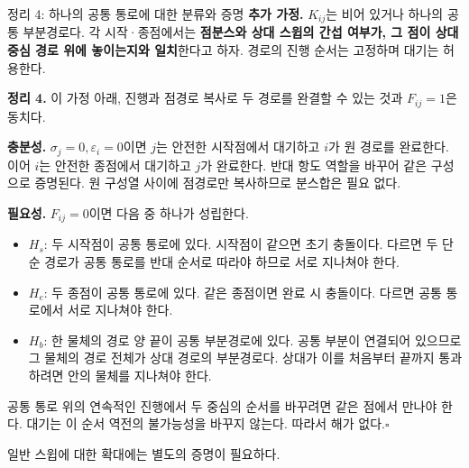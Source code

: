 \begin{frame}{정리 4: 하나의 공통 통로에 대한 분류와 증명}
\small
\textbf{추가 가정.} $K_{ij}$는 비어 있거나 하나의 공통 부분경로다.
각 시작·종점에서는 \textbf{점분스와 상대 스윕의 간섭 여부가,
그 점이 상대 중심 경로 위에 놓이는지와 일치}한다고 하자.
경로의 진행 순서는 고정하며 대기는 허용한다.
\par\smallskip
\textbf{정리 4.} 이 가정 아래,
진행과 점경로 복사로 두 경로를 완결할 수 있는 것과 $F_{ij}=1$은 동치다.
\par\smallskip
\textbf{충분성.} $\sigma_j=0,\varepsilon_i=0$이면 $j$는 안전한 시작점에서 대기하고
$i$가 원 경로를 완료한다. 이어 $i$는 안전한 종점에서 대기하고 $j$가 완료한다.
반대 항도 역할을 바꾸어 같은 구성으로 증명된다.
원 구성열 사이에 점경로만 복사하므로 분스합은 필요 없다.
\par\smallskip
\textbf{필요성.} $F_{ij}=0$이면 다음 중 하나가 성립한다.
\begin{itemize}
\item $H_s$: 두 시작점이 공통 통로에 있다. 시작점이 같으면 초기 충돌이다.
다르면 두 단순 경로가 공통 통로를 반대 순서로 따라야 하므로 서로 지나쳐야 한다.
\item $H_e$: 두 종점이 공통 통로에 있다. 같은 종점이면 완료 시 충돌이다.
다르면 공통 통로에서 서로 지나쳐야 한다.
\item $H_b$: 한 물체의 경로 양 끝이 공통 부분경로에 있다.
공통 부분이 연결되어 있으므로 그 물체의 경로 전체가 상대 경로의 부분경로다.
상대가 이를 처음부터 끝까지 통과하려면 안의 물체를 지나쳐야 한다.
\end{itemize}
공통 통로 위의 연속적인 진행에서 두 중심의 순서를 바꾸려면 같은 점에서 만나야 한다.
대기는 이 순서 역전의 불가능성을 바꾸지 않는다. 따라서 해가 없다.\hfill$\square$
\par\smallskip\scriptsize 일반 스윕에 대한 확대에는 별도의 증명이 필요하다.
\end{frame}

